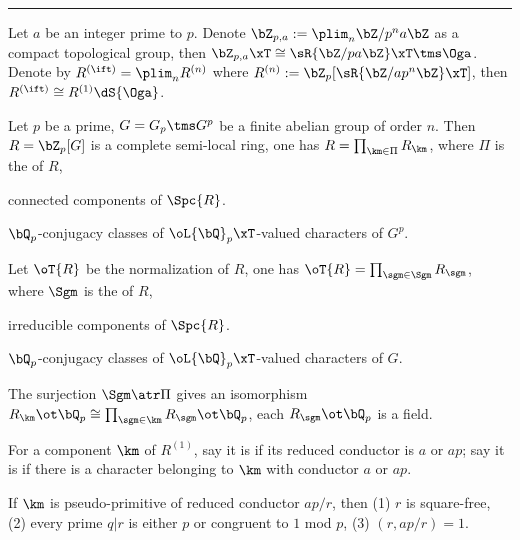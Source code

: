 \documentclass[article, a4paper, twoside]{universal}
\begin{document}
\hrule


\begin{stp}
	Let $a$ be an integer prime to $p$. Denote $\bZ_{p,a}:=\plim_{n}\bZ/p^{n}a\bZ$ as a compact topological group, then $\bZ_{p,a}\xT\cong\sR{\bZ/pa\bZ}\xT\tms\Oga$. Denote by $R^{(\ift)}=\plim_{n}R^{(n)}$ where $R^{(n)}:=\bZ_{p}[\sR{\bZ/ap^{n}\bZ}\xT]$, then $R^{(\ift)}\cong R^{(1)}\dS{\Oga}$.
\begin{cmt}
	\begin{thm}[{\cite[Page~195]{MW1984}}]
		Let $p$ be a prime, $G=G_{p}\tms G^{p}$ be a finite abelian group of order $n$. Then $R=\bZ_{p}[G]$ is a complete semi-local ring, one has $R=\prod_{\km\in\Pi}R_{\km}$, where $\Pi$ is the  of $R$,
		\begin{itm}
			\item connected components of $\Spc{R}$.
			\item $\bQ_{p}$-conjugacy classes of $\oL{\bQ}_{p}\xT$-valued characters of $G^{p}$.
		\end{itm}
		Let $\oT{R}$ be the normalization of $R$, one has $\oT{R}=\prod_{\sgm\in\Sgm}R_{\sgm}$, where $\Sgm$ is the  of $R$,
		\begin{itm}
			\item irreducible components of $\Spc{R}$.
			\item $\bQ_{p}$-conjugacy classes of $\oL{\bQ}_{p}\xT$-valued characters of $G$.
		\end{itm}
		The surjection $\Sgm\atr\Pi$ gives an isomorphism $R_{\km}\ot\bQ_{p}\cong\prod_{\sgm\in\km}R_{\sgm}\ot\bQ_{p}$, each $R_{\sgm}\ot\bQ_{p}$ is a field.
	\end{thm}
\end{cmt}

\end{stp}

\begin{cmt}
	\begin{dfn}
		For a component $\km$ of $R^{(1)}$, say it is  if its reduced conductor is $a$ or $ap$; say it is  if there is a character belonging to $\km$ with conductor $a$ or $ap$.

		If $\km$ is pseudo-primitive of reduced conductor $ap/r$, then (1) $r$ is square-free, (2) every prime $q|r$ is either $p$ or congruent to $1$ mod $p$, (3) $(r,ap/r)=1$.
	\end{dfn}

\end{cmt}
\end{document}
